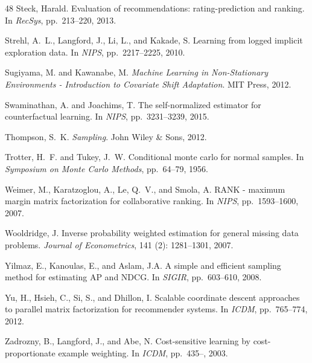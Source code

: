 \documentclass{article}
\begin{document}
\begin{thebibliography}{48}
Steck, Harald.
\newblock Evaluation of recommendations: rating-prediction and ranking.
\newblock In \emph{RecSys}, pp.\  213--220, 2013.

Strehl, A.~L., Langford, J., Li, L., and Kakade, S.
\newblock Learning from logged implicit exploration data.
\newblock In \emph{NIPS}, pp.\  2217--2225, 2010.

\vfill \eject

Sugiyama, M. and Kawanabe, M.
\newblock \emph{Machine Learning in Non-Stationary Environments - Introduction
  to Covariate Shift Adaptation}.
\newblock MIT Press, 2012.

Swaminathan, A. and Joachims, T.
\newblock The self-normalized estimator for counterfactual learning.
\newblock In \emph{NIPS}, pp.\  3231--3239, 2015.

Thompson, S.~K.
\newblock \emph{Sampling}.
\newblock John Wiley \& Sons, 2012.

Trotter, H.~F. and Tukey, J.~W.
\newblock Conditional monte carlo for normal samples.
\newblock In \emph{Symposium on Monte Carlo Methods}, pp.\  64--79, 1956.

Weimer, M., Karatzoglou, A., Le, Q.~V., and Smola, A.
 {RANK} - maximum margin matrix factorization for collaborative
  ranking.
\newblock In \emph{NIPS}, pp.\  1593--1600, 2007.

Wooldridge, J.
\newblock Inverse probability weighted estimation for general missing data
  problems.
\newblock \emph{Journal of Econometrics}, 141 (2):
  1281--1301, 2007.

Yilmaz, E., Kanoulas, E., and Aslam, J.A.
\newblock A simple and efficient sampling method for estimating {AP} and
  {NDCG}.
\newblock In \emph{SIGIR}, pp.\  603--610, 2008.

Yu, H., Hsieh, C., Si, S., and Dhillon, I.
\newblock Scalable coordinate descent approaches to parallel matrix
  factorization for recommender systems.
\newblock In \emph{ICDM}, pp.\  765--774, 2012.

Zadrozny, B., Langford, J., and Abe, N.
\newblock Cost-sensitive learning by cost-proportionate example weighting.
\newblock In \emph{ICDM}, pp.\  435--, 2003.

\end{thebibliography}
\end{document}
